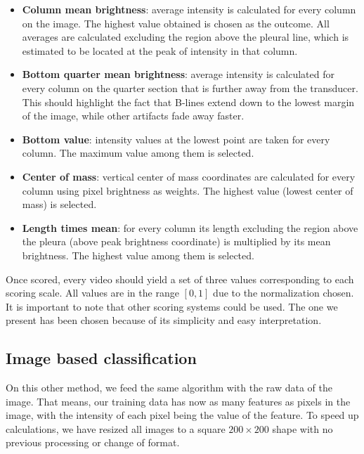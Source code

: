 \documentclass[11pt]{article} %
\begin{document}
\begin{itemize}
	\item \textbf{Column mean brightness}: average intensity is calculated for every column on the image. The highest value obtained is chosen as the outcome. All averages are calculated excluding the region above the pleural line, which is estimated to be located at the peak of intensity in that column.
	
	\item \textbf{Bottom quarter mean brightness}: average intensity is calculated for every column on the quarter section that is further away from the transducer. This should highlight the fact that B-lines extend down to the lowest margin of the image, while other artifacts fade away faster.
	
	\item \textbf{Bottom value}: intensity values at the lowest point are taken for every column. The maximum value among them is selected.
	
	\item \textbf{Center of mass}: vertical center of mass coordinates are calculated for every column using pixel brightness as weights. The highest value (lowest center of mass) is selected.
	
	\item\textbf{Length times mean}: for every column its length excluding the region above the pleura (above peak brightness coordinate) is multiplied by its mean brightness. The highest value among them is selected.
	
\end{itemize}

Once scored, every video should yield a set of three values corresponding to each scoring scale. All values are in the range $[0,1]$ due to the normalization chosen. It is important to note that other scoring systems could be used. The one we present has been chosen because of its simplicity and easy interpretation.



\subsection{Image based classification}
On this other method, we feed the same algorithm with the raw data of the image. That means, our training data has now as many features as pixels in the image, with the intensity of each pixel being the value of the feature. To speed up calculations, we have resized all images to a square $200 \times 200$ shape with no previous processing or change of format.
\end{document}
